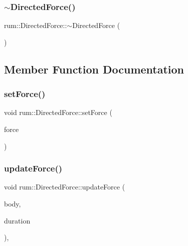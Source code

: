 \subsubsection{\texorpdfstring{$\sim$\+Directed\+Force()}{~DirectedForce()}}
{\footnotesize\ttfamily rum\+::\+Directed\+Force\+::$\sim$\+Directed\+Force (\begin{DoxyParamCaption}{ }\end{DoxyParamCaption})\hspace{0.3cm}{\ttfamily [default]}}



\subsection{Member Function Documentation}
\mbox{\label{classrum_1_1_directed_force_a733506320db57779ed18af5cad38e2dc}} 
\subsubsection{\texorpdfstring{set\+Force()}{setForce()}}
{\footnotesize\ttfamily void rum\+::\+Directed\+Force\+::set\+Force (\begin{DoxyParamCaption}\item[{const glm\+::vec3 \&}]{force }\end{DoxyParamCaption})}

\mbox{\label{classrum_1_1_directed_force_af775ae939b728dadcfcfa6d6719c6015}} 
\subsubsection{\texorpdfstring{update\+Force()}{updateForce()}}
{\footnotesize\ttfamily void rum\+::\+Directed\+Force\+::update\+Force (\begin{DoxyParamCaption}\item[{\mbox{\hyperlink{classrum_1_1_rigid_body}{Rigid\+Body}} $\ast$}]{body,  }\item[{\mbox{\hyperlink{namespacerum_a7e8cca23573d5eaead0f138cbaa4862c}{real}}}]{duration }\end{DoxyParamCaption})\hspace{0.3cm}{\ttfamily [override]}, {\ttfamily [virtual]}}




